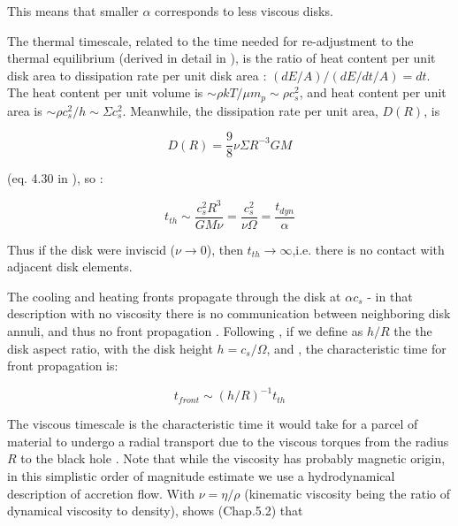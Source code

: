\documentclass[twocolumn]{aastex62}
\begin{document}
This means that smaller $\alpha$ corresponds to less viscous disks. 



The thermal timescale, related to the time needed for re-adjustment to the thermal equilibrium (derived in detail in \cite{frank2002}), is the ratio of heat content per unit disk area to dissipation rate per unit disk area : $(dE / A) / (dE/dt /  A) = dt $.  The heat content per unit volume is $\sim \rho k T / \mu m_{p} \sim \rho c_{s}^{2}$, and heat content per unit area is  $\sim \rho c_{s}^{2} / h \sim \Sigma c_{s}^{2}$. Meanwhile, the dissipation rate per unit area, $D(R)$, is 

\begin{equation}
D(R) = \frac{9}{8} \nu \Sigma R^{-3} G M
\end{equation}

(eq. 4.30 in \citealt{frank2002}), so :

\begin{equation}
t_{th} \sim \frac{c_{s}^{2}R^{3}}{G M \nu } = \frac{c_{s}^{2}}{\nu \Omega} = \frac{t_{dyn}}{\alpha}
\end{equation}

Thus if the disk were inviscid ($\nu \rightarrow 0$), then $t_{th} \rightarrow \infty$,i.e. there is no contact with adjacent disk elements. 

The cooling and heating fronts propagate through the disk at  $\alpha c_{s} $ \citep{hameury2009}  - in that description  with no viscosity there is no communication between neighboring disk annuli, and thus no front propagation \citep{balbus1998, balbus2003}. Following \cite{stern2018}, if we define as $h/R$  the the disk aspect ratio, with the disk height $h = c_{s} / \Omega$, and , the characteristic time for front propagation is:

\begin{equation}
t_{front} \sim (h/R) ^ {-1} t_{th}
\end{equation}


The viscous timescale is the characteristic time it would take for a parcel of material to undergo a radial transport due to the viscous torques from the radius $R$ to the black hole \citep{czerny2006}. Note that while the viscosity has probably magnetic origin\citep{eardley1975, grzedzielski2017}, in this simplistic order of magnitude estimate we use a hydrodynamical description of accretion flow.  With $\nu = \eta / \rho$ (kinematic viscosity being the ratio of dynamical viscosity to density), \cite{frank2002} shows (Chap.5.2) that 
\end{document}
